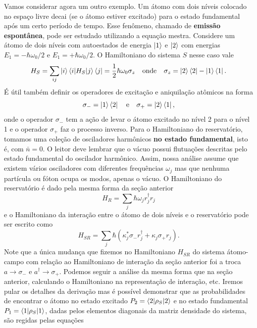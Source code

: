 \documentclass{article}
\begin{document}
Vamos considerar agora um outro exemplo. Um átomo com dois níveis colocado no espaço livre decai (se o átomo estiver excitado) para o estado fundamental após um certo período de tempo. Esse fenômeno, chamado de \textbf{emissão espontânea}, pode ser estudado utilizando a equação mestra. Considere um átomo de dois níveis com autoestados de energia $\ket{1}$ e $\ket{2}$ com energias $E_1 = -\hbar\omega_0/2$ e $E_1 = +\hbar\omega_0/2$. O Hamiltoniano do sistema $S$ nesse caso vale
\begin{equation}
    H_S = \sum_{ij}\ket{i}\braket{i|H_S|j}\bra{j} = \frac{1}{2}\hbar\omega_0\sigma_z \hspace{0.25cm} \text{ onde } \hspace{0.25cm} \sigma_z = \ket{2}\bra{2} - \ket{1}\bra{1} .
\end{equation}
É útil também definir os operadores de excitação e aniquilação atômicos na forma
\begin{equation}
    \sigma_{-} = \ket{1}\bra{2} \hspace{0.25cm} \text{ e } \hspace{0.25cm} \sigma_{+} = \ket{2}\bra{1},
\end{equation}
onde o operador $\sigma_-$ tem a ação de levar o átomo excitado no nível 2 para o nível 1 e o operador $\sigma_+$ faz o processo inverso. Para o Hamiltoniano do reservatório, tomamos uma coleção de osciladores harmônicos \textbf{no estado fundamental}, isto é, com $\bar{n} = 0$. O leitor deve lembrar que o vácuo possui flutuações descritas pelo estado fundamental do oscilador harmônico. Assim, nossa análise assume que existem vários osciladores com diferentes frequências $\omega_j$ mas que nenhuma partícula ou fóton ocupa os modos, apenas o vácuo. O Hamiltoniano do reservatório é dado pela mesma forma da seção anterior
\begin{equation}
    H_R = \sum_j \hbar\omega_j r_j^\dagger r_j
\end{equation}
e o Hamiltoniano da interação entre o átomo de dois níveis e o reservatório pode ser escrito como
\begin{equation}
H_{SR} = \sum_j \hbar(\kappa_j^* \sigma_- r_j^\dagger + \kappa_j \sigma_+ r_j).
\end{equation}
Note que a única mudança que fizemos no Hamiltoniano $H_{SR}$ do sistema átomo-campo com relação ao Hamiltoniano de interação da seção anterior foi a troca $a\rightarrow \sigma_-$ e $a^\dagger \rightarrow \sigma_+$. Podemos seguir a análise da mesma forma que na seção anterior, calculando o Hamiltoniano na representação de interação, etc. Iremos pular os detalhes da derivação mas é possível demonstrar que as probabilidades de encontrar o átomo no estado excitado $P_2 = \braket{2|\rho_S|2}$ e no estado fundamental $P_1 = \braket{1|\rho_S|1}$, dadas pelos elementos diagonais da matriz densidade do sistema, são regidas pelas equações 
\end{document}
